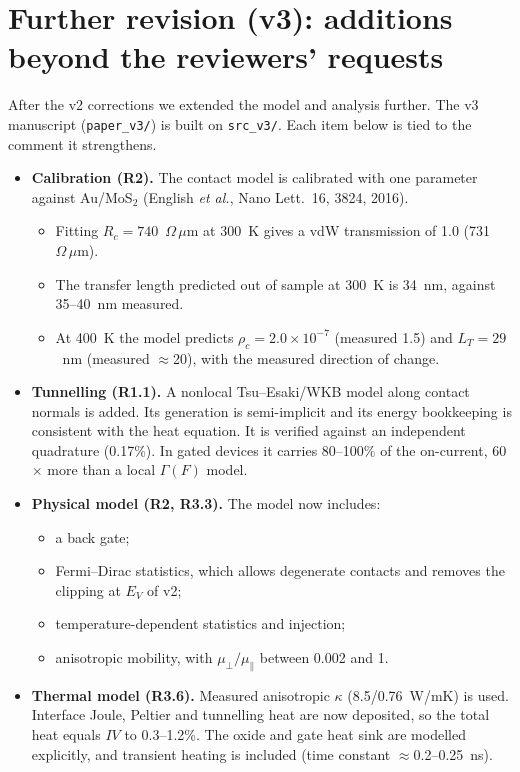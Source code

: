 \documentclass[11pt]{article}
\begin{document}
\section*{Further revision (v3): additions beyond the reviewers' requests}
After the v2 corrections we extended the model and analysis further. The v3 manuscript (\texttt{paper\_v3/}) is built on \texttt{src\_v3/}. Each item below is tied to the comment it strengthens.
\begin{itemize}[nosep]
\item \textbf{Calibration (R2).} The contact model is calibrated with one parameter against Au/MoS$_2$ (English \textit{et al.}, Nano Lett.\ 16, 3824, 2016).
  \begin{itemize}[nosep]
  \item Fitting $R_c=740$~$\Omega\,\mu$m at 300~K gives a vdW transmission of 1.0 (731~$\Omega\,\mu$m).
  \item The transfer length predicted out of sample at 300~K is 34~nm, against 35--40~nm measured.
  \item At 400~K the model predicts $\rho_c=2.0\times10^{-7}$ (measured 1.5) and $L_T=29$~nm (measured $\approx$20), with the measured direction of change.
  \end{itemize}
\item \textbf{Tunnelling (R1.1).} A nonlocal Tsu--Esaki/WKB model along contact normals is added. Its generation is semi-implicit and its energy bookkeeping is consistent with the heat equation. It is verified against an independent quadrature (0.17\%). In gated devices it carries 80--100\% of the on-current, 60$\times$ more than a local $\Gamma(F)$ model.
\item \textbf{Physical model (R2, R3.3).} The model now includes:
  \begin{itemize}[nosep]
  \item a back gate;
  \item Fermi--Dirac statistics, which allows degenerate contacts and removes the clipping at $E_V$ of v2;
  \item temperature-dependent statistics and injection;
  \item anisotropic mobility, with $\mu_\perp/\mu_\parallel$ between 0.002 and 1.
  \end{itemize}
\item \textbf{Thermal model (R3.6).} Measured anisotropic $\kappa$ (8.5/0.76~W/mK) is used. Interface Joule, Peltier and tunnelling heat are now deposited, so the total heat equals $IV$ to 0.3--1.2\%. The oxide and gate heat sink are modelled explicitly, and transient heating is included (time constant $\approx$0.2--0.25~ns).

\end{itemize}
\end{document}
